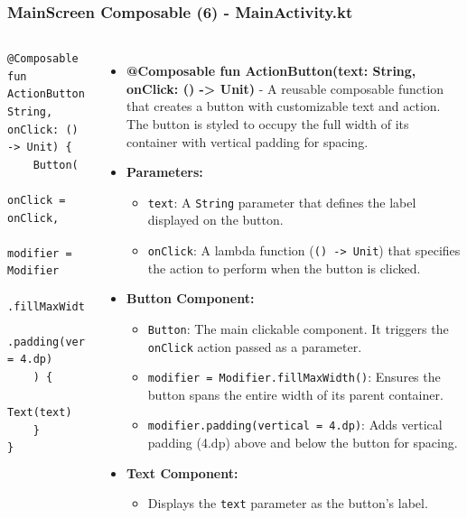 \documentclass[pdf,
serif,
compress,
xcolor=table,
dvipsnames,
spanish,
aspectratio=169]{beamer}
\begin{document}
\begin{frame}[fragile]
    \frametitle{MainScreen Composable (6) - MainActivity.kt}
\begin{columns}
\begin{verbatim}
@Composable
fun ActionButton(text: String, onClick: () -> Unit) {
    Button(
        onClick = onClick,
        modifier = Modifier
            .fillMaxWidth()
            .padding(vertical = 4.dp)
    ) {
        Text(text)
    }
}
\end{verbatim}
\begin{itemize}
    \item\tiny \textbf{@Composable fun ActionButton(text: String, onClick: () -> Unit)} - A reusable composable function that creates a button with customizable text and action. The button is styled to occupy the full width of its container with vertical padding for spacing.

    \item\tiny  \textbf{Parameters:}
    \begin{itemize}\tiny 
        \item \texttt{text}: A \texttt{String} parameter that defines the label displayed on the button.
        \item \texttt{onClick}: A lambda function (\texttt{() -> Unit}) that specifies the action to perform when the button is clicked.
    \end{itemize}

    \item\tiny  \textbf{Button Component:}
    \begin{itemize}\tiny 
        \item \texttt{Button}: The main clickable component. It triggers the \texttt{onClick} action passed as a parameter.
        \item \texttt{modifier = Modifier.fillMaxWidth()}: Ensures the button spans the entire width of its parent container.
        \item \texttt{modifier.padding(vertical = 4.dp)}: Adds vertical padding (4.dp) above and below the button for spacing.
    \end{itemize}

    \item \tiny \textbf{Text Component:}
    \begin{itemize}\tiny 
        \item Displays the \texttt{text} parameter as the button's label.
    \end{itemize}
\end{itemize}

\end{columns}
\end{frame}
\end{document}
